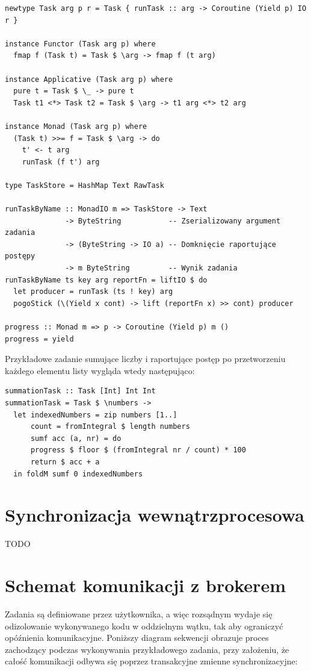 \begin{lstlisting}[caption=Ostateczna implementacja zadania]
newtype Task arg p r = Task { runTask :: arg -> Coroutine (Yield p) IO r }
  
instance Functor (Task arg p) where
  fmap f (Task t) = Task $ \arg -> fmap f (t arg)
  
instance Applicative (Task arg p) where
  pure t = Task $ \_ -> pure t
  Task t1 <*> Task t2 = Task $ \arg -> t1 arg <*> t2 arg
  
instance Monad (Task arg p) where
  (Task t) >>= f = Task $ \arg -> do
    t' <- t arg
    runTask (f t') arg 
  
type TaskStore = HashMap Text RawTask

runTaskByName :: MonadIO m => TaskStore -> Text 
              -> ByteString           -- Zserializowany argument zadania
              -> (ByteString -> IO a) -- Domknięcie raportujące postępy
              -> m ByteString         -- Wynik zadania
runTaskByName ts key arg reportFn = liftIO $ do
  let producer = runTask (ts ! key) arg
  pogoStick (\(Yield x cont) -> lift (reportFn x) >> cont) producer

progress :: Monad m => p -> Coroutine (Yield p) m ()
progress = yield
\end{lstlisting}

Przykładowe zadanie sumujące liczby i raportujące postęp po przetworzeniu każdego elementu listy wygląda wtedy następująco:
\begin{lstlisting}
summationTask :: Task [Int] Int Int
summationTask = Task $ \numbers -> 
  let indexedNumbers = zip numbers [1..]
      count = fromIntegral $ length numbers
      sumf acc (a, nr) = do
      progress $ floor $ (fromIntegral nr / count) * 100
      return $ acc + a
  in foldM sumf 0 indexedNumbers
\end{lstlisting}

\section{Synchronizacja wewnątrzprocesowa}
TODO

\section{Schemat komunikacji z brokerem}
Zadania są definiowane przez użytkownika, a więc rozsądnym wydaje się odizolowanie wykonywanego kodu w oddzielnym wątku, tak aby ograniczyć opóźnienia komunikacyjne. Poniższy diagram sekwencji obrazuje proces zachodzący podczas wykonywania przykładowego zadania, przy założeniu, że całość komunikacji odbywa się poprzez transakcyjne zmienne synchronizacyjne:

